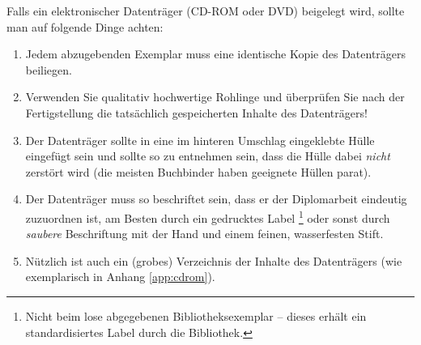 Falls ein elektronischer Datenträger (CD-ROM oder DVD) beigelegt
wird, sollte man auf folgende Dinge achten:
%
\begin{enumerate}
\item Jedem abzugebenden Exemplar muss eine identische Kopie des
Datenträgers beiliegen. %
\item Verwenden Sie qualitativ hochwertige Rohlinge und überprüfen
Sie nach der Fertigstellung die tatsächlich gespeicherten Inhalte
des Datenträgers! %
\item Der Datenträger sollte in eine im hinteren Umschlag
eingeklebte Hülle eingefügt sein und sollte so zu entnehmen sein,
dass die Hülle dabei \emph{nicht} zerstört wird (die
meisten Buchbinder haben geeignete Hüllen parat). %
\item Der Datenträger muss so beschriftet sein, dass er der
Diplomarbeit eindeutig zuzuordnen ist, am Besten durch ein
gedrucktes Label%
\footnote{Nicht beim lose abgegebenen Bibliotheksexemplar --
dieses erhält ein standardisiertes Label durch die Bibliothek.} %
oder sonst durch \emph{saubere}
Beschriftung mit
der Hand und einem feinen, wasserfesten Stift. %
\item Nützlich ist auch ein (grobes) Verzeichnis der Inhalte des
Datenträgers (wie exemplarisch in Anhang \ref{app:cdrom}).
\end{enumerate}
